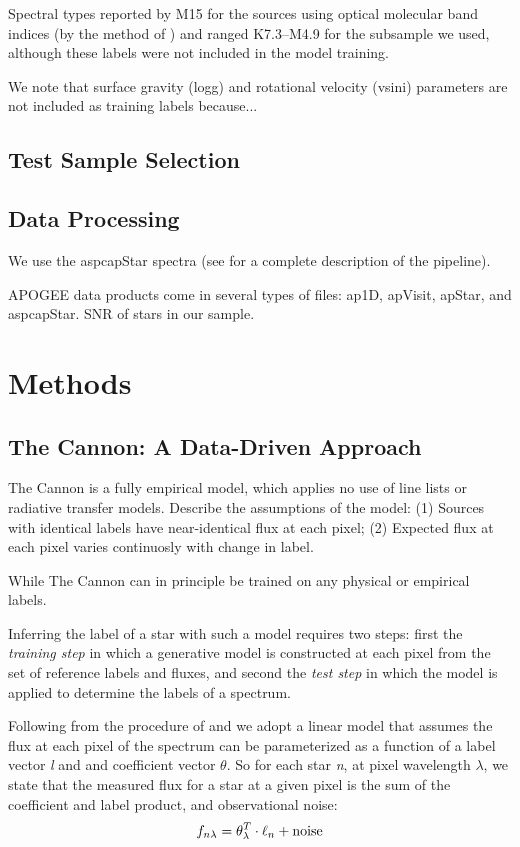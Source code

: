 \documentclass[modern]{aastex62}
\begin{document}
Spectral types reported by M15 for the sources using optical molecular band indices (by the method of \citealt{Lepine:2013}) and ranged K7.3--M4.9 for the subsample we used, although these labels were not included in the model training.

We note that surface gravity (logg) and rotational velocity (vsini) parameters are not included as training labels because...

\subsection{Test Sample Selection}

\subsection{Data Processing}

We use the aspcapStar spectra (see \citealt{Perez:2016} for a complete description of the pipeline).

APOGEE data products come in several types of files: ap1D, apVisit, apStar, and aspcapStar. SNR of stars in our sample.


\section{Methods} \label{sec:cannon}

\subsection{The Cannon: A Data-Driven Approach}

The Cannon is a fully empirical model, which applies no use of line lists or radiative transfer models. Describe the assumptions of the model: (1) Sources with identical labels have near-identical flux at each pixel; (2) Expected flux at each pixel varies continuosly with change in label. 

While The Cannon can in principle be trained on any physical or empirical labels.

Inferring the label of a star with such a model requires two steps: first the \emph{training step} in which a generative model is constructed at each pixel from the set of reference labels and fluxes, and second the \emph{test step} in which the model is applied to determine the labels of a spectrum.

Following from the procedure of \citealt{Ness:2015} and \citealt{Ho:2017a} we adopt a linear model that assumes the flux at each pixel of the spectrum can be parameterized as a function of a label vector \emph{l} and and coefficient vector \emph{$\theta$}. So for each star \emph{n}, at pixel wavelength \emph{$\lambda$}, we state that the measured flux for a star at a given pixel is the sum of the coefficient and label product, and observational noise:
\begin{equation}
	f_{n\lambda} = \theta_{\lambda}^{T} \cdot \ell_{n} + {\rm noise}
\end{equation}
\end{document}

